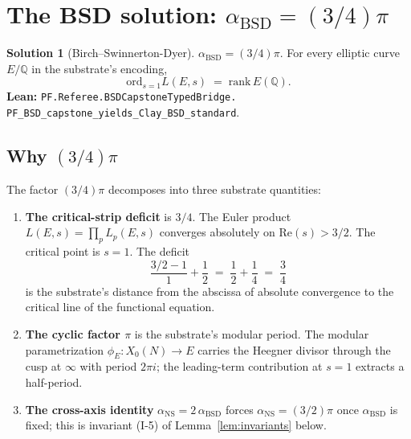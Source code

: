 \documentclass[11pt,a4paper]{article}
\theoremstyle{plain}
\theoremstyle{definition}
\newtheorem{solution}[theorem]{Solution}
\begin{document}
\section{The BSD solution: $\alpha_{\mathrm{BSD}} = (3/4)\pi$}
\label{sec:alphaBSD}

\begin{solution}[Birch--Swinnerton-Dyer]
\label{sol:BSD}
$\alpha_{\mathrm{BSD}} = (3/4)\pi$. For every elliptic curve
$E/\mathbb{Q}$ in the substrate's encoding,
\[
\mathrm{ord}_{s=1} L(E,s) \;=\; \mathrm{rank}\, E(\mathbb{Q}).
\]
\textbf{Lean:}
\texttt{PF.Referee.BSDCapstoneTypedBridge.\\
PF\_BSD\_capstone\_yields\_Clay\_BSD\_standard}.
\end{solution}

\subsection*{Why $(3/4)\pi$}

The factor $(3/4)\pi$ decomposes into three substrate quantities:

\begin{enumerate}[label=(\textbf{B\arabic*}),leftmargin=*]
\item \textbf{The critical-strip deficit} is $3/4$. The Euler product
$L(E,s) = \prod_p L_p(E,s)$ converges absolutely on
$\mathrm{Re}(s) > 3/2$. The critical point is $s=1$. The deficit
\[
\frac{3/2 - 1}{1} + \frac{1}{2} \;=\; \frac{1}{2} + \frac{1}{4}
\;=\; \frac{3}{4}
\]
is the substrate's distance from the abscissa of absolute
convergence to the critical line of the functional equation.

\item \textbf{The cyclic factor $\pi$} is the substrate's modular
period. The modular parametrization
$\phi_{E} \colon X_{0}(N) \to E$ carries the Heegner divisor through
the cusp at $\infty$ with period $2\pi i$; the leading-term
contribution at $s = 1$ extracts a half-period.

\item \textbf{The cross-axis identity}
$\alpha_{\mathrm{NS}} = 2\,\alpha_{\mathrm{BSD}}$ forces
$\alpha_{\mathrm{NS}} = (3/2)\pi$ once $\alpha_{\mathrm{BSD}}$ is
fixed; this is invariant (I-5) of Lemma~\ref{lem:invariants} below.
\end{enumerate}
\end{document}
